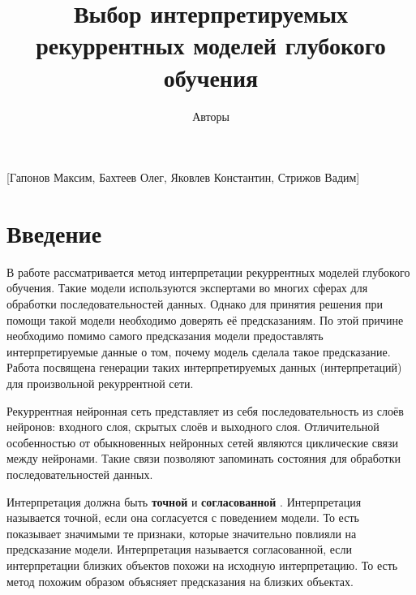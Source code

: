 \documentclass[12pt, twoside]{article}
\begin{document}
\title
    []
    {Выбор интерпретируемых рекуррентных моделей глубокого обучения}

\author
    []
    {Авторы}
    [Гапонов Максим, Бахтеев Олег, Яковлев Константин, Стрижов Вадим]


\maketitle
\linenumbers
\section{Введение}
В работе рассматривается метод интерпретации рекуррентных моделей глубокого обучения. Такие модели используются экспертами во многих сферах для обработки последовательностей данных. Однако для принятия решения при помощи такой модели необходимо доверять её предсказаниям. По этой причине необходимо помимо самого предсказания модели предоставлять интерпретируемые данные о том, почему модель сделала такое предсказание. Работа посвящена генерации таких интерпретируемых данных (интерпретаций) для произвольной рекуррентной сети.

Рекуррентная нейронная сеть представляет из себя последовательность из слоёв нейронов: входного слоя, скрытых слоёв и выходного слоя. Отличительной особенностью от обыкновенных нейронных сетей являются циклические связи между нейронами. Такие связи позволяют запоминать состояния для обработки последовательностей данных.

Интерпретация должна быть \textbf{точной} и \textbf{согласованной} \cite{chu2019exact}. Интерпретация называется точной, если она согласуется с поведением модели. То есть показывает значимыми те признаки, которые значительно повлияли на предсказание модели. Интерпретация называется согласованной, если интерпретации близких объектов похожи на исходную интерпретацию. То есть метод похожим образом объясняет предсказания на близких объектах.
\end{document}
